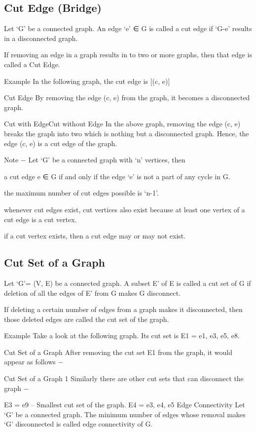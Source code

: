 \subsection{Cut Edge (Bridge)}
Let ‘G’ be a connected graph. An edge ‘e’ ∈ G is called a cut edge if ‘G-e’ results in a disconnected graph.

If removing an edge in a graph results in to two or more graphs, then that edge is called a Cut Edge.

Example
In the following graph, the cut edge is [(c, e)]

Cut Edge
By removing the edge (c, e) from the graph, it becomes a disconnected graph.

Cut with EdgeCut without Edge
In the above graph, removing the edge (c, e) breaks the graph into two which is nothing but a disconnected graph. Hence, the edge (c, e) is a cut edge of the graph.

Note − Let ‘G’ be a connected graph with ‘n’ vertices, then

a cut edge e ∈ G if and only if the edge ‘e’ is not a part of any cycle in G.

the maximum number of cut edges possible is ‘n-1’.

whenever cut edges exist, cut vertices also exist because at least one vertex of a cut edge is a cut vertex.

if a cut vertex exists, then a cut edge may or may not exist.

\subsection{Cut Set of a Graph}
Let ‘G’= (V, E) be a connected graph. A subset E’ of E is called a cut set of G if deletion of all the edges of E’ from G makes G disconnect.

If deleting a certain number of edges from a graph makes it disconnected, then those deleted edges are called the cut set of the graph.

Example
Take a look at the following graph. Its cut set is E1 = {e1, e3, e5, e8}.

Cut Set of a Graph
After removing the cut set E1 from the graph, it would appear as follows −

Cut Set of a Graph 1
Similarly there are other cut sets that can disconnect the graph −

E3 = {e9} – Smallest cut set of the graph.
E4 = {e3, e4, e5}
Edge Connectivity
Let ‘G’ be a connected graph. The minimum number of edges whose removal makes ‘G’ disconnected is called edge connectivity of G.

